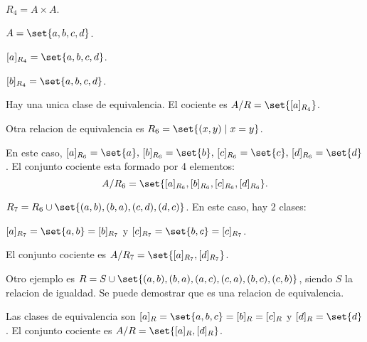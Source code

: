 \begin{example}
	\(R_4 = A \times A \).

	\(A = \set{a,b,c,d }\).

	\([a]_{R_4} = \set{a,b,c,d }\).

	\([b]_{R_4} = \set{a,b,c,d }\).

	Hay una unica clase de equivalencia. El cociente es \(A/R = \set{[a]_{R_4 }}\).
	\vspace{2pt}

	Otra relacion de equivalencia es \(R_6 = \set{(x,y) \mid x = y }\).

	En este caso, \([a]_{R_6} = \set{a}, \, [b]_{R_6} = \set{b}, \, [c]_{R_6} = \set{c}, \, [d]_{R_6} = \set{d }\). El conjunto cociente esta formado por 4 elementos: \[A/R_6 = \set{[a]_{R_6}, [b]_{R_6}, [c]_{R_6}, [d]_{R_6}}.\]

	\vspace{2pt}
	\(R_7 = R_6 \cup \set{(a,b), (b,a), (c,d), (d,c)}\). En este caso, hay 2 clases:

	\([a]_{R_7} = \set{a,b} = [b]_{R_7 }\) y \([c]_{R_7} = \set{b,c} = [c]_{R_7}\).

	El conjunto cociente es \(A/R_7 = \set{[a]_{R_7}, [d]_{R_7}}\).

	\vspace{2pt}
	Otro ejemplo es \(R = S \cup \set{(a,b), (b,a), (a,c), (c,a), (b,c), (c,b )}\), siendo \(S \) la relacion de igualdad. Se puede demostrar que es una relacion de equivalencia.

	Las clases de equivalencia son \([a]_R = \set{a,b,c} = [b]_R = [c]_R \) y \([d]_R = \set{d }\). El conjunto cociente es \(A/R = \set{[a]_R, [d]_R }\).
\end{example}


